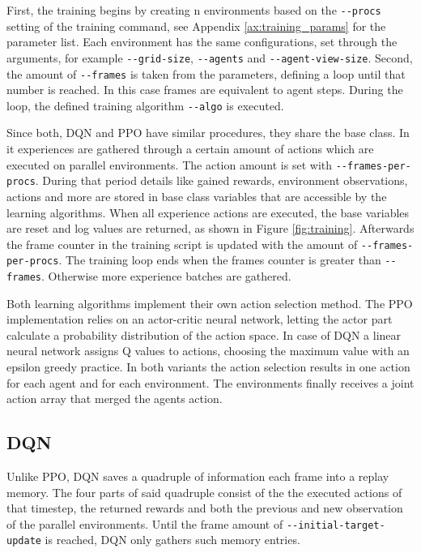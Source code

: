 First, the training begins by creating n environments based on the \verb|--procs| setting of the training command, see Appendix \ref{ax:training_params} for the parameter list. Each environment has the same configurations, set through the arguments, for example \verb|--grid-size|, \verb|--agents| and \verb|--agent-view-size|. Second, the amount of \verb|--frames| is taken from the parameters, defining a loop until that number is reached. In this case frames are equivalent to agent steps. During the loop, the defined training algorithm \verb|--algo| is executed.

Since both, DQN and PPO have similar procedures, they share the base class. In it experiences are gathered through a certain amount of actions which are executed on parallel environments. The action amount is set with \verb|--frames-per-procs|. During that period details like gained rewards, environment observations, actions and more are stored in base class variables that are accessible by the learning algorithms. When all experience actions are executed, the base variables are reset and log values are returned, as shown in Figure \ref{fig:training}. Afterwards the frame counter in the training script is updated with the amount of \verb|--frames-per-procs|. The training loop ends when the frames counter is greater than \verb|--frames|. Otherwise more experience batches are gathered.

Both learning algorithms implement their own action selection method. The PPO implementation relies on an actor-critic neural network, letting the actor part calculate a probability distribution of the action space. In case of DQN a linear neural network assigns Q values to actions, choosing the maximum value with an epsilon greedy practice. In both variants the action selection results in one action for each agent and for each environment. The environments finally receives a joint action array that merged the agents action.

\subsection{DQN}
Unlike PPO, DQN saves a quadruple of information each frame into a replay memory. The four parts of said quadruple consist of the the executed actions of that timestep, the returned rewards and both the previous and new observation of the parallel environments. Until the frame amount of \verb|--initial-target-update| is reached, DQN only gathers such memory entries.

